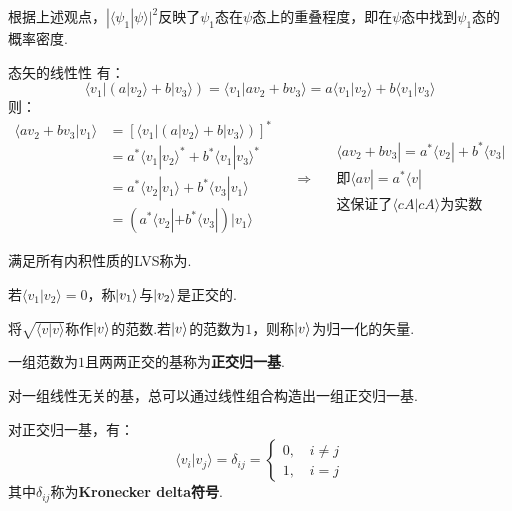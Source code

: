 根据上述观点，$|\langle \psi_1 | \psi \rangle|^2$反映了$\psi_1$态在$\psi$态上的重叠程度，即在$\psi$态中找到$\psi_1$态的概率密度.

\begin{extension}{态矢的线性性}
    有：
    \[\langle v_1 | (a |v_2 \rangle + b |v_3 \rangle) = \langle v_1 | a v_2 + b v_3 \rangle = a \langle v_1 | v_2 \rangle + b \langle v_1 | v_3 \rangle\]
    则：
    \[
    \begin{aligned} \langle a v_2 + b v_3 | v_1 \rangle &= [\langle v_1 | (a |v_2 \rangle + b |v_3 \rangle)]^* \\ &= a^* \langle v_1 | v_2 \rangle^* + b^* \langle v_1 | v_3 \rangle^* \\ &= a^* \langle v_2 | v_1 \rangle + b^* \langle v_3 | v_1 \rangle \\ &= (a^* \langle v_2 | + b^* \langle v_3 |) | v_1 \rangle \end{aligned}
    \quad \begin{aligned}
        & \langle a v_2 + b v_3 | = a^* \langle v_2 | + b^* \langle v_3 | \\
        \Rightarrow \quad &\text{即} \langle av | = a^* \langle v |\\
        &\text{这保证了} \langle cA | cA \rangle \text{为实数}
    \end{aligned}
    \]
\end{extension}

\begin{definition}
    满足所有内积性质的LVS称为.
\end{definition}
\begin{definition}
    若$\langle v_1|v_2 \rangle = 0$，称$\ket{v_1}$与$\ket{v_2}$是正交的.
\end{definition}
\begin{definition}
    将$\sqrt{\langle v|v \rangle}$称作$\ket{v}$的范数.若$\ket{v}$的范数为$1$，则称$\ket{v}$为归一化的矢量.
\end{definition}
\begin{definition}
    一组范数为$1$且两两正交的基称为\textbf{正交归一基}.

\end{definition}
对一组线性无关的基，总可以通过线性组合构造出一组正交归一基.

对正交归一基，有：
\[\langle v_i | v_j \rangle = \delta_{ij} = \begin{cases}
    0,\quad i \neq j \\
    1,\quad i = j
\end{cases}\]
其中$\delta_{ij}$称为\textbf{Kronecker delta符号}.

